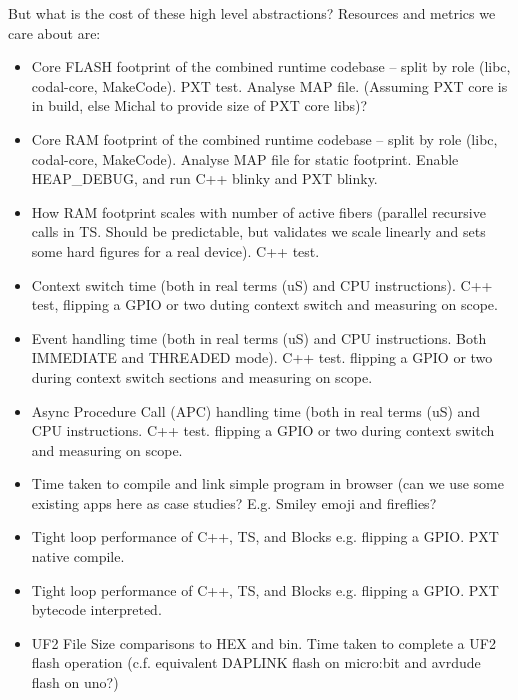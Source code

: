 But what is the cost of these high level abstractions? Resources and metrics we care about are:
\begin{itemize}
\item Core FLASH footprint of the combined runtime codebase -- 
      split by role (libc, codal-core, MakeCode). PXT test. 
      Analyse MAP file. (Assuming PXT core is in build, 
      else Michal to provide size of PXT core libs)?
\item Core RAM footprint of the combined runtime codebase --
      split by role (libc, codal-core, MakeCode). Analyse MAP file for static footprint. 
      Enable HEAP\_DEBUG, and run C++ blinky and PXT blinky.
\item How RAM footprint scales with number of active fibers (parallel recursive calls in TS. 
      Should be predictable, but validates we scale linearly and sets some hard figures 
      for a real device). C++ test.
\item Context switch time (both in real terms (uS) and CPU instructions). C++ test, 
      flipping a GPIO or two duting context switch and measuring on scope.
\item Event handling time (both in real terms (uS) and CPU instructions. 
      Both IMMEDIATE and THREADED mode). C++ test. flipping a GPIO or two during context 
      switch sections and measuring on scope.
\item Async Procedure Call (APC) handling time (both in real terms (uS) and CPU instructions. 
      C++ test. flipping a GPIO or two during context switch and measuring on scope.
\item Time taken to compile and link simple program in browser (can we use some existing apps 
      here as case studies? E.g. Smiley emoji and fireflies?
\item Tight loop performance of C++, TS, and Blocks e.g. flipping a GPIO. PXT native compile.
\item Tight loop performance of C++, TS, and Blocks e.g. flipping a GPIO. PXT bytecode interpreted.
\item UF2 File Size comparisons to HEX and bin. Time taken to complete a UF2 flash operation 
    (c.f. equivalent DAPLINK flash on micro:bit and avrdude flash on uno?)
\end{itemize}


\subsection{\CO}

